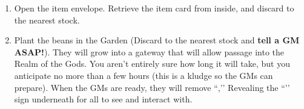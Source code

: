 \documentclass[green]{GL2020}
\begin{document}
\begin{enumerate}
  \item Open the \iBeansNB{} item envelope. Retrieve the \iBeansMB{} item card from inside, and discard \iBeansNB{} to the nearest stock.
  \item Plant the beans in the Garden (Discard \iBeansMB{} to the nearest stock and \textbf{tell a GM ASAP!}). They will grow into a gateway that will allow passage into the Realm of the Gods. You aren’t entirely sure how long it will take, but you anticipate no more than a few hours (this is a kludge so the GMs can prepare). When the GMs are ready, they will remove ``\sSignB{},’’ Revealing the ``\sMagicPortal{}’’ sign underneath for all to see and interact with.
\end{enumerate}
\end{document}
